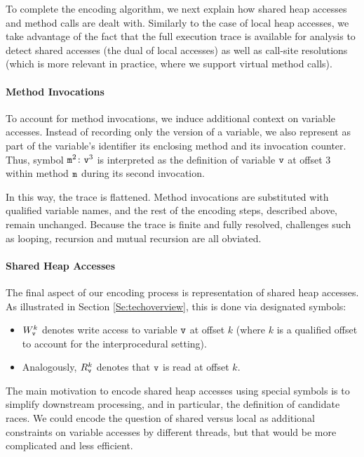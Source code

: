 To complete the encoding algorithm, we next explain how shared heap accesses and method calls are dealt with. Similarly to the case of local heap accesses, we take advantage of the fact that the full execution trace is available for analysis to detect shared accesses (the dual of local accesses) as well as call-site resolutions (which is more relevant in practice, where we support virtual method calls).

\paragraph{Method Invocations} To account for method invocations, we induce additional context on variable accesses. Instead of recording only the version of a variable, we also represent as part of the variable's identifier its enclosing method and its invocation counter. Thus, symbol ${\tt m}^2 \colon {\tt v}^3$ is interpreted as the definition of variable ${\tt v}$ at offset 3 within method ${\tt m}$ during its second invocation. 

In this way, the trace is flattened. Method invocations are substituted with qualified variable names, and the rest of the encoding steps, described above, remain unchanged. Because the trace is finite and fully resolved, challenges such as looping, recursion and mutual recursion are all obviated.

\paragraph{Shared Heap Accesses} The final aspect of our encoding process is representation of shared heap accesses. As illustrated in Section \ref{Se:techoverview}, this is done via designated symbols:
\begin{itemize}
	\item $W^{k}_{\tt v}$ denotes write access to variable ${\tt v}$ at offset $k$ (where $k$ is a qualified offset to account  for the interprocedural setting).
	\item Analogously, $R^{k}_{\tt v}$ denotes that ${\tt v}$ is read at offset $k$.
\end{itemize}

The main motivation to encode shared heap accesses using special symbols is to simplify downstream processing, and in particular, the definition of candidate races. We could encode the question of shared versus local as additional constraints on variable accesses by different threads, but that would be more complicated and less efficient.


